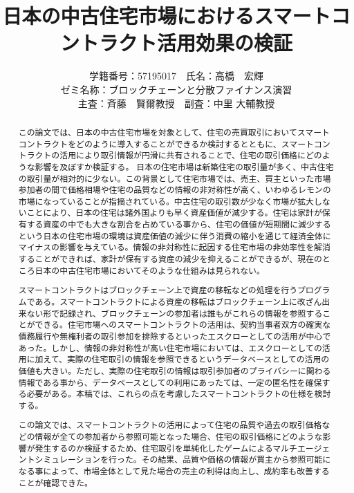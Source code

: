 \documentclass[a4paper,fontsize=11pt,report,notitlepage,line_length=38zw,number_of_lines=40]{jlreq}
\title{日本の中古住宅市場におけるスマートコントラクト活用効果の検証}
\author{
学籍番号：57195017　氏名：高橋　宏輝
\\ゼミ名称：ブロックチェーンと分散ファイナンス演習
\\主査：斉藤　賢爾教授　副査：中里 大輔教授}
\begin{document}
\date{}
\maketitle
\begin{abstract}
この論文では、日本の中古住宅市場を対象として、住宅の売買取引においてスマートコントラクトをどのように導入することができるか検討するとともに、スマートコントラクトの活用により取引情報が円滑に共有されることで、住宅の取引価格にどのような影響を及ぼすか検証する。
日本の住宅市場は新築住宅の取引量が多く、中古住宅の取引量が相対的に少ない。この背景として住宅市場では、売主、買主といった市場参加者の間で価格相場や住宅の品質などの情報の非対称性が高く、いわゆるレモンの市場になっていることが指摘されている。中古住宅の取引数が少なく市場が拡大しないことにより、日本の住宅は諸外国よりも早く資産価値が減少する。住宅は家計が保有する資産の中でも大きな割合を占めている事から、住宅の価値が短期間に減少するという日本の住宅市場の環境は資産価値の減少に伴う消費の縮小を通じて経済全体にマイナスの影響を与えている。情報の非対称性に起因する住宅市場の非効率性を解消することができれば、家計が保有する資産の減少を抑えることができるが、現在のところ日本の中古住宅市場においてそのような仕組みは見られない。

スマートコントラクトはブロックチェーン上で資産の移転などの処理を行うプログラムである。スマートコントラクトによる資産の移転はブロックチェーン上に改ざん出来ない形で記録され、ブロックチェーンの参加者は誰もがこれらの情報を参照することができる。住宅市場へのスマートコントラクトの活用は、契約当事者双方の確実な債務履行や無権利者の取引参加を排除するといったエスクローとしての活用が中心であった。しかし、情報の非対称性が高い住宅市場においては、エスクローとしての活用に加えて、実際の住宅取引の情報を参照できるというデータベースとしての活用の価値も大きい。ただし、実際の住宅取引の情報は取引参加者のプライバシーに関わる情報である事から、データベースとしての利用にあったては、一定の匿名性を確保する必要がある。本稿では、これらの点を考慮したスマートコントラクトの仕様を検討する。

この論文では、スマートコントラクトの活用によって住宅の品質や過去の取引価格などの情報が全ての参加者から参照可能となった場合、住宅の取引価格にどのような影響が発生するのか検証するため、住宅取引を単純化したゲームによるマルチエージェントシミュレーションを行った。その結果、品質や価格の情報が買主から参照可能になる事によって、市場全体として見た場合の売主の利得は向上し、成約率も改善することが確認できた。
\end{abstract}

\newpage
\tableofcontents
\end{document}
